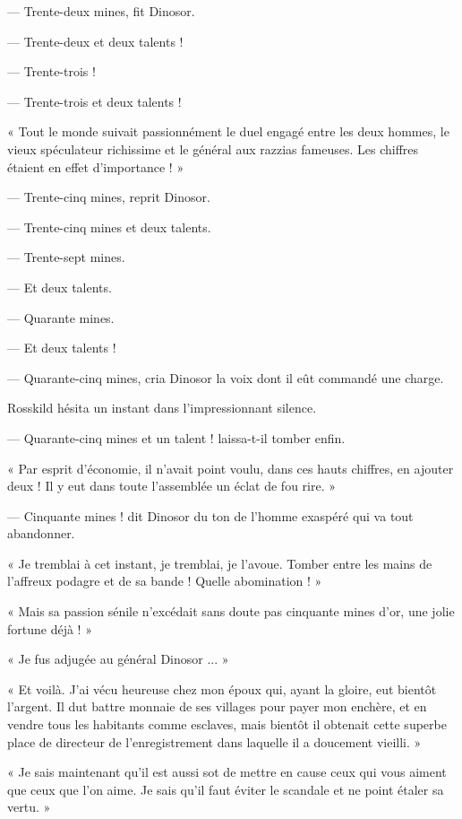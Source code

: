 \documentclass[a4paper, 11pt, oneside, polutonikogreek, french]{article}
\begin{document}
--- Trente-deux mines, fit Dinosor.

--- Trente-deux et deux talents !

--- Trente-trois !

--- Trente-trois et deux talents !

« Tout le monde suivait passionnément le duel engagé entre les deux hommes, le vieux spéculateur richissime et le général aux razzias fameuses. Les chiffres étaient en effet d'importance ! »

--- Trente-cinq mines, reprit Dinosor.

--- Trente-cinq mines et deux talents.

--- Trente-sept mines.

--- Et deux talents.

--- Quarante mines.

--- Et deux talents !

--- Quarante-cinq mines, cria Dinosor la voix dont il eût commandé une charge.

Rosskild hésita un instant dans l'impressionnant silence.

--- Quarante-cinq mines et un talent ! laissa-t-il tomber enfin.

« Par esprit d'économie, il n'avait point voulu, dans ces hauts chiffres, en ajouter deux ! Il y eut dans toute l'assemblée un éclat de fou rire. »

--- Cinquante mines ! dit Dinosor du ton de l'homme exaspéré qui va tout abandonner.

« Je tremblai à cet instant, je tremblai, je l'avoue. Tomber entre les mains de l'affreux podagre et de sa bande ! Quelle abomination ! »

« Mais sa passion sénile n'excédait sans doute pas cinquante mines d'or, une jolie fortune déjà ! »

« Je fus adjugée au général Dinosor ... »

\bigskip
\centerline{\EightStarTaper}
\centerline{\EightStarTaper\EightStarTaper}
\bigskip

« Et voilà. J'ai vécu heureuse chez mon époux qui, ayant la gloire, eut bientôt l'argent. Il dut battre monnaie de ses villages pour payer mon enchère, et en vendre tous les habitants comme esclaves, mais bientôt il obtenait cette superbe place de directeur de l'enregistrement dans laquelle il a doucement vieilli. »

« Je sais maintenant qu'il est aussi sot de mettre en cause ceux qui vous aiment que ceux que l'on aime. Je sais qu'il faut éviter le scandale et ne point étaler sa vertu. »
\end{document}
